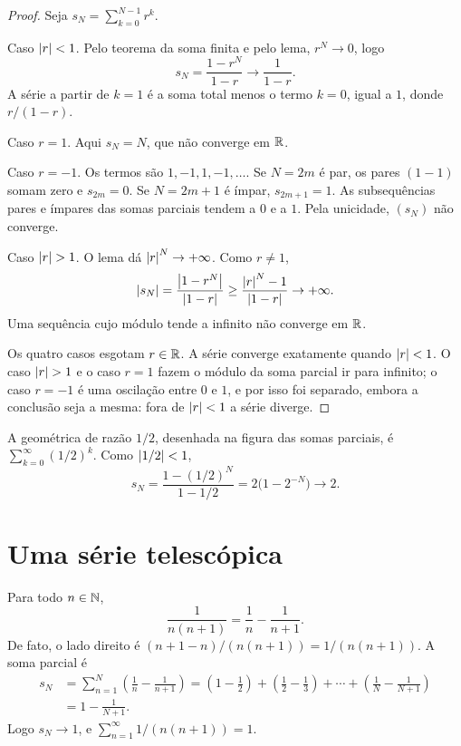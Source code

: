 \documentclass[11pt,a4paper]{article}
\begin{document}
\begin{proof}
Seja \(s_N=\sum_{k=0}^{N-1} r^k\).

Caso \(\left\lvert r \right\rvert<1\). Pelo teorema da soma finita e pelo lema, \(r^N\to 0\), logo
\[
s_N=\frac{1-r^N}{1-r}\to\frac{1}{1-r}.
\]
A série a partir de \(k=1\) é a soma total menos o termo \(k=0\), igual a \(1\), donde \(r/(1-r)\).

Caso \(r=1\). Aqui \(s_N=N\), que não converge em \(\mathbb{R}\).

Caso \(r=-1\). Os termos são \(1,-1,1,-1,\ldots\). Se \(N=2m\) é par, os pares \((1-1)\) somam zero e \(s_{2m}=0\). Se \(N=2m+1\) é ímpar, \(s_{2m+1}=1\). As subsequências pares e ímpares das somas parciais tendem a \(0\) e a \(1\). Pela unicidade, \((s_N)\) não converge.

Caso \(\left\lvert r \right\rvert>1\). O lema dá \(\left\lvert r \right\rvert^N\to+\infty\). Como \(r\neq 1\),
\[
\left\lvert s_N \right\rvert=\frac{\left\lvert 1-r^N \right\rvert}{\left\lvert 1-r \right\rvert}\ge\frac{\left\lvert r \right\rvert^N-1}{\left\lvert 1-r \right\rvert}\to+\infty.
\]
Uma sequência cujo módulo tende a infinito não converge em \(\mathbb{R}\).

Os quatro casos esgotam \(r\in\mathbb{R}\). A série converge exatamente quando \(\left\lvert r \right\rvert<1\). O caso \(\left\lvert r \right\rvert>1\) e o caso \(r=1\) fazem o módulo da soma parcial ir para infinito; o caso \(r=-1\) é uma oscilação entre \(0\) e \(1\), e por isso foi separado, embora a conclusão seja a mesma: fora de \(\left\lvert r \right\rvert<1\) a série diverge.
\end{proof}

\begin{exemplo}
A geométrica de razão \(1/2\), desenhada na figura das somas parciais, é \(\sum_{k=0}^\infty (1/2)^k\). Como \(\left\lvert 1/2 \right\rvert<1\),
\[
s_N=\frac{1-(1/2)^N}{1-1/2}=2\bigl(1-2^{-N}\bigr)\to 2.
\]
\end{exemplo}

\section{Uma série telescópica}

\begin{exemplo}
Para todo \(n\in\mathbb{N}\),
\[
\frac{1}{n(n+1)}=\frac{1}{n}-\frac{1}{n+1}.
\]
De fato, o lado direito é \((n+1-n)/(n(n+1))=1/(n(n+1))\). A soma parcial é
\begin{align*}
s_N
&=\sum_{n=1}^N\left(\frac{1}{n}-\frac{1}{n+1}\right)
=\left(1-\frac{1}{2}\right)+\left(\frac{1}{2}-\frac{1}{3}\right)+\cdots+\left(\frac{1}{N}-\frac{1}{N+1}\right)\\
&=1-\frac{1}{N+1}.
\end{align*}
Logo \(s_N\to 1\), e \(\sum_{n=1}^\infty 1/(n(n+1))=1\).
\end{exemplo}
\end{document}
